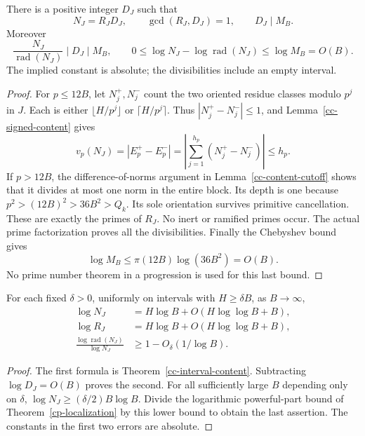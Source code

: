 \begin{theorem}
\label{cp-localization}
There is a positive integer \(D_J\) such that
\[
 N_J=R_JD_J,\qquad \gcd(R_J,D_J)=1,\qquad D_J\mid M_B.
\]
Moreover
\[
 \frac{N_J}{\operatorname{rad}(N_J)}\mid D_J\mid M_B,
 \qquad 0\le\log N_J-\log\operatorname{rad}(N_J)
                \le\log M_B=O(B).
\]
The implied constant is absolute; the divisibilities include an empty
interval.
\end{theorem}
\begin{proof}
For \(p\le12B\), let \(N_j^+,N_j^-\) count the two oriented residue
classes modulo \(p^j\) in \(J\). Each is either
\(\lfloor H/p^j\rfloor\) or \(\lceil H/p^j\rceil\). Thus
\( |N_j^+-N_j^-|\le1\), and Lemma~\ref{cc-signed-content} gives
\[
 v_p(N_J)=|E_p^+-E_p^-|
    =\left|\sum_{j=1}^{h_p}(N_j^+-N_j^-)\right|\le h_p.
\]
If \(p>12B\), the difference-of-norms argument in
Lemma~\ref{cc-content-cutoff} shows that it divides at most one norm
in the entire block. Its depth is one because
\(p^2>(12B)^2>36B^2>Q_k\). Its sole orientation survives primitive
cancellation. These are exactly the primes of \(R_J\). No inert or
ramified primes occur. The actual prime factorization proves all the
divisibilities. Finally the Chebyshev bound gives
\[
 \log M_B\le\pi(12B)\log(36B^2)=O(B).
\]
No prime number theorem in a progression is used for this last bound.
\end{proof}

\begin{corollary}
\label{cp-radical-mass}
For each fixed \(\delta>0\), uniformly on intervals with \(H\ge\delta B\),
as \(B\to\infty\),
\begin{align*}
 \log N_J&=H\log B+O(H\log\log B+B),\\
 \log R_J&=H\log B+O(H\log\log B+B),\\
 \frac{\log\operatorname{rad}(N_J)}{\log N_J}
          &\ge1-O_\delta(1/\log B).
\end{align*}
\end{corollary}
\begin{proof}
The first formula is Theorem~\ref{cc-interval-content}. Subtracting
\(\log D_J=O(B)\) proves the second. For all sufficiently large \(B\)
depending only on \(\delta\),
\(\log N_J\ge(\delta/2)B\log B\). Divide the logarithmic powerful-part
bound of Theorem~\ref{cp-localization} by this lower bound to obtain
the last assertion. The constants in the first two errors are absolute.
\end{proof}

